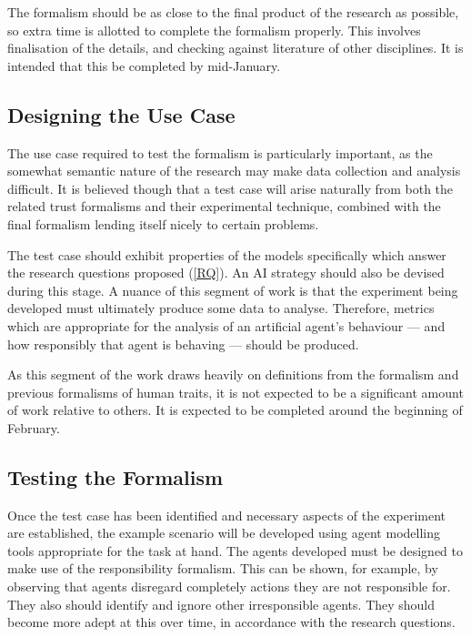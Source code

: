 The formalism should be as close to the final product of the research as possible, so extra time is allotted to complete the formalism properly. This involves finalisation of the details, and checking against literature of other disciplines. It is intended that this be completed by mid-January.\par

\subsection{Designing the Use Case}
The use case required to test the formalism is particularly important, as the somewhat semantic nature of the research may make data collection and analysis difficult. It is believed though that a test case will arise naturally from both the related trust formalisms and their experimental technique, combined with the final formalism lending itself nicely to certain problems.\par

The test case should exhibit properties of the models specifically which answer the research questions proposed (\cref{RQ}). An AI strategy should also be devised during this stage. A nuance of this segment of work is that the experiment being developed must ultimately produce some data to analyse. Therefore, metrics which are appropriate for the analysis of an artificial agent's behaviour --- and how responsibly that agent is behaving --- should be produced.\par

As this segment of the work draws heavily on definitions from the formalism and previous formalisms of human traits, it is not expected to be a significant amount of work relative to others. It is expected to be completed around the beginning of February.\par

\subsection{Testing the Formalism}
Once the test case has been identified and necessary aspects of the experiment are established, the example scenario will be developed using agent modelling tools appropriate for the task at hand. The agents developed must be designed to make use of the responsibility formalism. This can be shown, for example, by observing that agents disregard completely actions they are not responsible for. They also should identify and ignore other irresponsible agents. They should become more adept at this over time, in accordance with the research questions.\par

